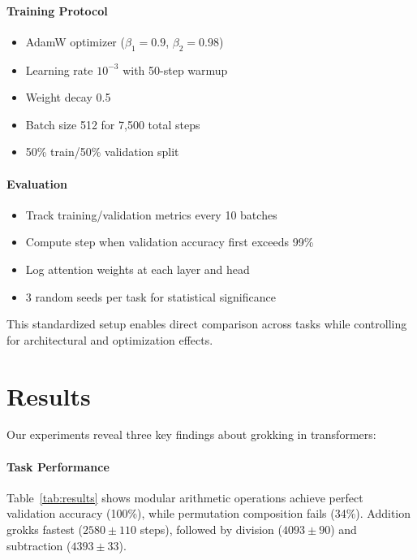 \documentclass{article} %
\begin{document}
\paragraph{Training Protocol}
\begin{itemize}
    \item AdamW optimizer \citep{loshchilov2017adamw} ($\beta_1=0.9$, $\beta_2=0.98$)
    \item Learning rate $10^{-3}$ with 50-step warmup
    \item Weight decay 0.5
    \item Batch size 512 for 7,500 total steps
    \item 50\% train/50\% validation split
\end{itemize}

\paragraph{Evaluation}
\begin{itemize}
    \item Track training/validation metrics every 10 batches
    \item Compute step when validation accuracy first exceeds 99\%
    \item Log attention weights at each layer and head
    \item 3 random seeds per task for statistical significance
\end{itemize}

This standardized setup enables direct comparison across tasks while controlling for architectural and optimization effects.

\section{Results}
\label{sec:results}

Our experiments reveal three key findings about grokking in transformers:

\paragraph{Task Performance} Table~\ref{tab:results} shows modular arithmetic operations achieve perfect validation accuracy (100\%), while permutation composition fails (34\%). Addition grokks fastest ($2580 \pm 110$ steps), followed by division ($4093 \pm 90$) and subtraction ($4393 \pm 33$).
\end{document}
